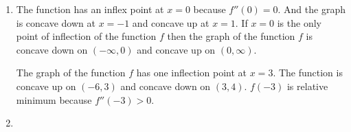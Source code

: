 \documentclass[13pt, a4paper, twoside]{article}
\begin{document}
\begin{enumerate}
\item The function has an inflex point at $x=0$ because $f''(0)=0$. And the graph is
concave down at $x=-1$ and concave up at $x=1$. If $x=0$ is the only point of inflection
of the function $f$ then the graph of the function $f$ is concave down on $(-\infty,0)$ and concave up 
on  $(0, \infty)$.

The graph of the function $f$ has one inflection point at $x=3$. The function is 
concave up on $(-6,3)$ and concave down on $(3, 4)$. $f(-3)$ is relative minimum because $f''(-3)>0$.

\item 

\end{enumerate}
\end{document}
